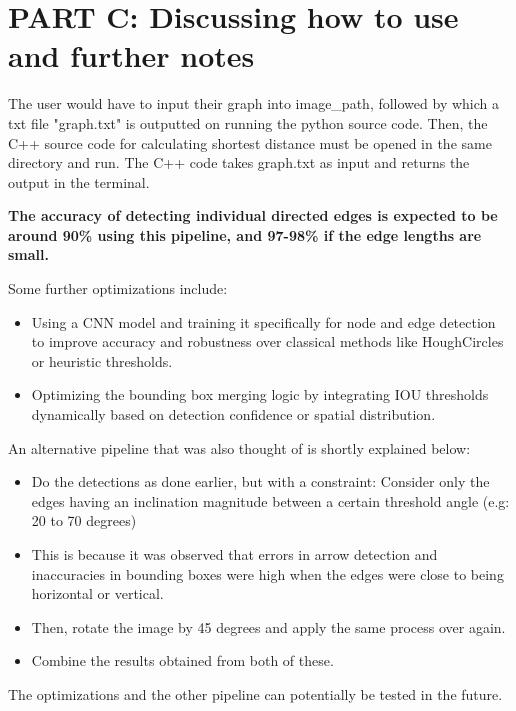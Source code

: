 \documentclass{article}
\begin{document}
\section{PART C: Discussing how to use and further notes}
The user would have to input their graph into image\_path, followed by which a txt file "graph.txt" is outputted on running the python source code. Then, the C++ source code for calculating shortest distance must be opened in the same directory and run. The C++ code takes graph.txt as input and returns the output in the terminal.

\textbf{The accuracy of detecting individual directed edges is expected to be  around 90\% using this pipeline, and 97-98\% if the edge lengths are small.}

Some further optimizations include:
\begin{itemize}
    \item Using a CNN model and training it specifically for node and edge detection to improve accuracy and robustness over classical methods like HoughCircles or heuristic thresholds.
    \item  Optimizing the bounding box merging logic by integrating IOU thresholds dynamically based on detection confidence or spatial distribution.
\end{itemize}

An alternative pipeline that was also thought of is shortly explained below:
\begin{itemize}
    \item Do the detections as done earlier, but with a constraint: Consider only the edges having an inclination magnitude between a certain threshold angle (e.g: 20 to 70 degrees)
    \item This is because it was observed that errors in arrow detection and inaccuracies in bounding boxes were high when the edges were close to being horizontal or vertical.
    \item Then, rotate the image by 45 degrees and apply the same process over again.
    \item Combine the results obtained from both of these.
\end{itemize}

The optimizations and the other pipeline can potentially be tested in the future.
\end{document}

